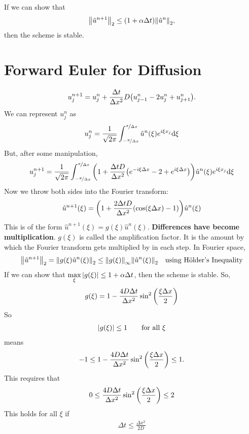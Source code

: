 \documentclass{article}
\newcommand{\Dx}{\Delta x}
\newcommand{\Dt}{\Delta t}
\begin{document}
            If we can show that
            \begin{align*}
                \norm{\hat{u}^{n+1}}_2 \leq \qty(1 + \alpha\Dt)\norm{\hat{u}^n}_2,
            \end{align*}
            then the scheme is stable.

    \section{Forward Euler for Diffusion}

        $$u_j^{n+1} = u_j^n + \frac{\Dt}{\Dx^2}D\qty(u_{j-1}^n - 2u_j^n + u_{j+1}^n).$$
        We can represent $u_j^n$ as
        \begin{align*}
            u_j^n = \frac{1}{\sqrt{2\pi}}\int_{-\nicefrac{\pi}{\Dx}}^{\nicefrac{\pi}{\Dx}}\hat{u}^n(\xi)e^{i\xi x_j}\dd \xi
        \end{align*}
        But, after some manipulation,
        \begin{align*}
            u_j^{n+1} = \frac{1}{\sqrt{2\pi}}\int_{-\nicefrac{\pi}{\Dx}}^{\nicefrac{\pi}{\Dx}}\qty(1 + \frac{\Dt D}{\Dx^2}\qty(e^{-i\xi\Dx} - 2 + e^{i\xi\Dx}))\hat{u}^n(\xi)e^{i\xi x_j}\dd\xi
        \end{align*}
        Now we throw both sides into the Fourier transform:
        \begin{align*}
            \hat{u}^{n+1}(\xi) = \qty(1 + \frac{2\Dt D}{\Dx^2}\qty(\cos(\xi\Dx) - 1))\hat{u}^n(\xi)
        \end{align*}
        This is of the form $\hat{u}^{n+1}(\xi) = g(\xi)\hat{u}^n(\xi)$.  \textbf{Differences have become multiplication}.  $g(\xi)$ is called the amplification factor.  It is the amount by which the Fourier transform gets multiplied by in each step.
        In Fourier space,
        \begin{align*}
            \norm{\hat{u}^{n+1}}_2 = \norm{g(\xi)\hat{u}^n(\xi)}_2 \leq \norm{g(\xi)}_\infty\norm{\hat{u}^n(\xi)}_2 && \text{using H$\ddot{\text{o}}$lder's Inequality}
        \end{align*}
        If we can show that $\displaystyle\max_\xi\abs{g(\xi)} \leq 1 + \alpha \Dt$, then the scheme is stable.  So,
        \begin{align*}
            g(\xi) = 1 - \frac{4D\Dt}{\Dx^2}\sin^2\qty(\frac{\xi\Dx}{2})
        \end{align*}
        So
        \begin{align*}
            \abs{g(\xi)} \leq 1 \qquad \text{for all } \xi
        \end{align*}
        means
        \begin{align*}
            -1 \leq 1 - \frac{4D\Dt}{\Dx^2}\sin^2\qty(\frac{\xi\Dx}{2}) \leq 1.
        \end{align*}
        This requires that
        \begin{align*}
            0 \leq \frac{4D\Dt}{\Dx^2}\sin^2\qty(\frac{\xi\Dx}{2}) \leq 2
        \end{align*}
        This holds for all $\xi$ if
        \begin{align*}
            \Dt \leq \frac{\Dx^2}{2D}
        \end{align*}
\end{document}
